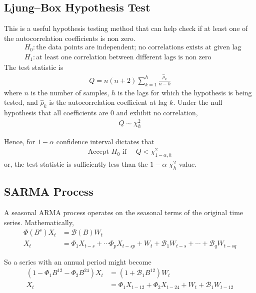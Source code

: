 \documentclass[../../time_series_notes.tex]{subfiles}
\begin{document}
\subsection{Ljung–Box Hypothesis Test}
This is a useful hypothesis testing method that can help check if at least one of the autocorrelation coefficients is non zero. 
\begin{align*}
    &H_{0}: \text{the data points are independent; no correlations exists at given lag}\\
    &H_{1}: \text{at least one correlation between different lags is non zero}
\end{align*}
The test statistic is
\begin{align*}
    Q = n(n+2) \sum_{k=1}^{h}\frac{\hat{\rho}_{k}}{n-k}
\end{align*}
where $n$ is the number of samples, $h$ is the lags for which the hypothesis is being tested, and $\hat{\rho}_{k}$ is the autocorrelation coefficient at lag $k$. Under the null hypothesis that all coefficients are 0 and exhibit no correlation,
\begin{align*}
    Q \sim \chi_{h}^{2}
\end{align*}

Hence, for $1-\alpha$ confidence interval dictates that
\begin{align*}
    \text{Accept $H_{0}$ if } \quad Q < \chi_{1-\alpha, h}^{2}
\end{align*}
or, the test statistic is sufficiently less than the $1-\alpha$ $\chi_{h}^{2}$ value.



\subsection{SARMA Process}
A seasonal ARMA process operates on the seasonal terms of the original time series. Mathematically,
\begin{align*}
    \Phi(B^{s})X_{t} &= \mathcal{B}(B)W_{t}\\
    X_{t} &= \Phi_{1}X_{t-s} + \cdots \Phi_{p}X_{t-sp} + W_{t} + \mathcal{B}_{1}W_{t-s} + \cdots + \mathcal{B}_{q}W_{t-sq}
\end{align*}

So a series with an annual period might become
\begin{align*}
    (1 - \Phi_{1}B^{12} - \Phi_{2}B^{24})X_{t} &= (1 + \mathcal{B}_{1}B^{12})W_{t}\\
    X_{t} &= \Phi_{1}X_{t-12} + \Phi_{2}X_{t-24} + W_{t} + \mathcal{B}_{1}W_{t-12}
\end{align*}
\end{document}
